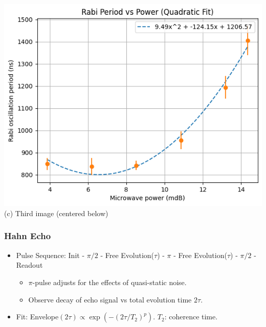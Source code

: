 \begin{frame}{}
    \vspace{1em} %

    \begin{minipage}{0.5\textwidth}
        \centering
        \includegraphics[width=\linewidth]{presentation/figs/period_vs_power.png} \\
        {\small (c) Third image (centered below)}
    \end{minipage}
\end{frame}
\begin{frame}
\frametitle{Hahn Echo}
\begin{itemize}
    \item Pulse Sequence: Init - $\pi/2$ - Free Evolution($\tau$) - $\pi$ - Free Evolution($\tau$) - $\pi/2$ - Readout
    \begin{itemize}
        \item $\pi$-pulse adjusts for the effects of quasi-static noise. 
        \item Observe decay of echo signal vs total evolution time $2\tau$.
    \end{itemize}
    \item Fit: Envelope$(2\tau) \propto \exp(-(2\tau/T_2)^p)$. $T_2$: coherence time. 
\end{itemize}

\end{frame}

